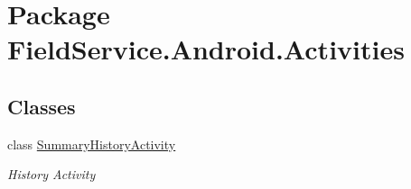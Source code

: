\hypertarget{namespace_field_service_1_1_android_1_1_activities}{\section{Package Field\+Service.\+Android.\+Activities}
\label{namespace_field_service_1_1_android_1_1_activities}
}
\subsection*{Classes}
\begin{DoxyCompactItemize}
\item 
class \hyperlink{class_field_service_1_1_android_1_1_activities_1_1_summary_history_activity}{Summary\+History\+Activity}
\begin{DoxyCompactList}\small\item\em History Activity \end{DoxyCompactList}\end{DoxyCompactItemize}
